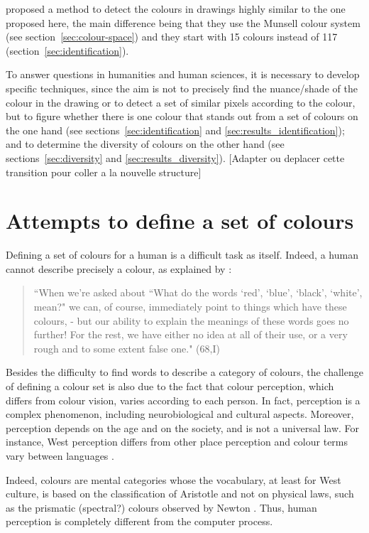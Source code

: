 \documentclass[11pt,a4paper]{article}
\begin{document}
\citet{kimbaelee2007} proposed a method to detect the colours in drawings highly similar to the one proposed here, the main difference being that they use the Munsell colour system (see section~\ref{sec:colour-space}) and they start with 15 colours instead of 117 (section~\ref{sec:identification}).

To answer questions in humanities and human sciences, it is necessary to develop specific
techniques, since the aim is not to precisely find the nuance/shade of the
colour in the drawing or to detect a set of similar pixels according to the colour, but to figure whether there is one colour that stands
out from a set of colours on the one hand (see sections~\ref{sec:identification} and \ref{sec:results_identification}); and to determine the diversity of colours on the
other hand (see sections~\ref{sec:diversity} and \ref{sec:results_diversity}). {\color{red} [Adapter ou deplacer cette transition pour coller a la nouvelle structure]}


\section{Attempts to define a set of colours}
\label{sec:set_col_definition}

Defining a set of colours for a human is a difficult task as itself. Indeed, a human cannot describe precisely a colour, as explained by \citet{wittgenstein1977}:

\begin{quote}
	``When we're asked about ``What do the words `red', `blue', `black',
	`white', mean?" we can, of course, immediately point to things which
	have these colours, - but our ability to explain the meanings of these
	words goes no further! For the rest, we have either no idea at all of
	their use, or a very rough and to some extent false one." (68,I)
\end{quote}

Besides the difficulty to find words to describe a category of colours, the challenge of defining a colour set is also due to the fact that colour perception, which differs from colour vision, varies according to each person. In fact, perception is a complex phenomenon, including neurobiological and cultural aspects. 
Moreover, perception depends on the age and on the society, and is not a universal law. 
For instance, West perception differs from other place perception and colour terms vary between languages \cite[][pp. 35 and 87]{pastoureau2017}.

Indeed, colours are mental categories whose the vocabulary, at least for West culture, is based on the classification of Aristotle and not on physical laws, such as the prismatic (spectral?) colours observed by Newton 
\cite[][pp. 12 and 90-91]{pastoureau2017}. Thus, human perception is completely different from the computer process.
\end{document}

